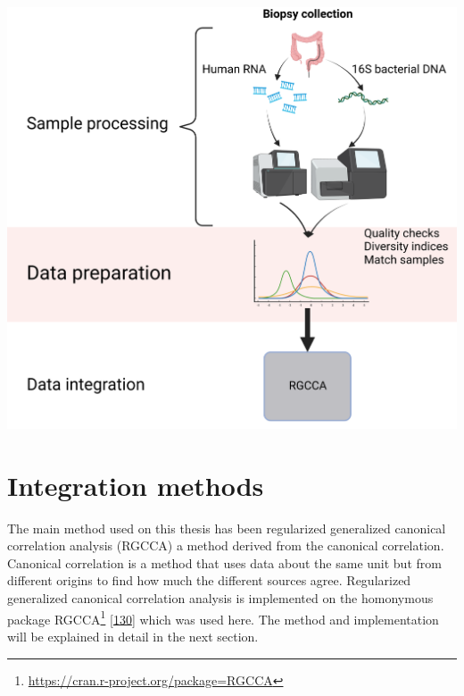\documentclass[
  12pt,
  a4paper,
  twoside,
  openright]{book}
\DeclareRobustCommand{\href}[2]{#2\footnote{\url{#1}}}
\let\origfigure\figure
\let\endorigfigure\endfigure
\renewenvironment{figure}[1][2] {
    \expandafter\origfigure\expandafter[!htp]
} {
    \endorigfigure
}
\begin{document}
\begin{figure}
\includegraphics[width=1\linewidth]{images/workflow_integration2} \caption[Workflow of the analysis process.]{Workflow of the main analysis process of the thesis. Created with BioRender.com}\label{fig:workflow-process}
\end{figure}

\hypertarget{integration-methods}{%
\section{Integration methods}\label{integration-methods}}

The main method used on this thesis has been regularized generalized canonical correlation analysis (RGCCA) a method derived from the canonical correlation.
Canonical correlation is a method that uses data about the same unit but from different origins to find how much the different sources agree.
Regularized generalized canonical correlation analysis is implemented on the homonymous package \href{https://cran.r-project.org/package=RGCCA}{RGCCA} {[}\protect\hyperlink{ref-tenenhaus2017}{130}{]} which was used here.
The method and implementation will be explained in detail in the next section.
\end{document}
